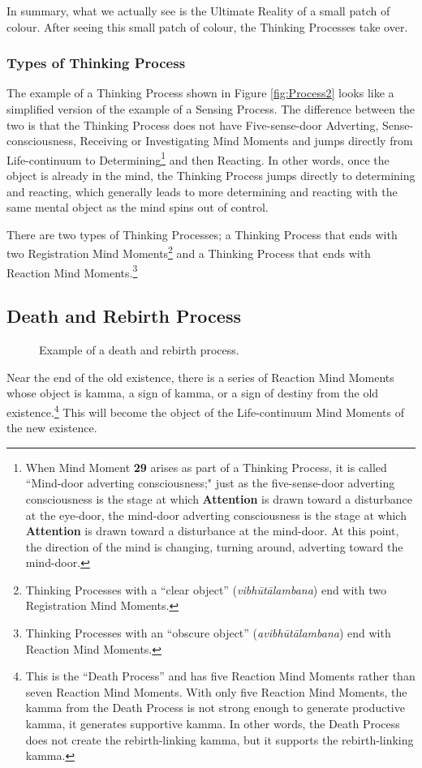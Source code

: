 In summary, what we actually see is the Ultimate Reality of a small patch of colour. After seeing this small patch of colour, the Thinking Processes take over.

\subsubsection*{Types of Thinking Process}

The example of a Thinking Process shown in Figure \ref{fig:Process2} looks like a simplified version of the example of a Sensing Process. The difference between the two is that the Thinking Process does not have Five-sense-door Adverting, Sense-consciousness, Receiving or Investigating Mind Moments and jumps directly from Life-continuum to Determining\footnote{When Mind Moment \textbf{29} arises as part of a Thinking Process, it is called “Mind-door adverting consciousness;" just as the five-sense-door adverting consciousness is the stage at which \textbf{Attention} is drawn toward a disturbance at the eye-door, the mind-door adverting consciousness is the stage at which \textbf{Attention} is drawn toward a disturbance at the mind-door. At this point, the direction of the mind is changing, turning around, adverting toward the mind-door.} and then Reacting. In other words, once the object is already in the mind, the Thinking Process jumps directly to determining and reacting, which generally leads to more determining and reacting with the same mental object as the mind spins out of control.

There are two types of Thinking Processes; a Thinking Process that ends with two Registration Mind Moments\footnote{Thinking Processes with a “clear object” (\textit{vibhūtālambana}) end with two Registration Mind Moments.} and a Thinking Process that ends with Reaction Mind Moments.\footnote{Thinking Processes with an “obscure object” (\textit{avibhūtālambana}) end with Reaction Mind Moments.}

\subsection*{Death and Rebirth Process}

\begin{figure}[H]
\centering

\caption{Example of a death and rebirth process.}
\label{fig:Death}
\end{figure}

Near the end of the old existence, there is a series of Reaction Mind Moments whose object is kamma, a sign of kamma, or a sign of destiny from the old existence.\footnote{This is the “Death Process” and has five Reaction Mind Moments rather than seven Reaction Mind Moments. With only five Reaction Mind Moments, the kamma from the Death Process is not strong enough to generate productive kamma, it generates supportive kamma. In other words, the Death Process does not create the rebirth-linking kamma, but it supports the rebirth-linking kamma.} This will become the object of the Life-continuum Mind Moments of the new existence. 

